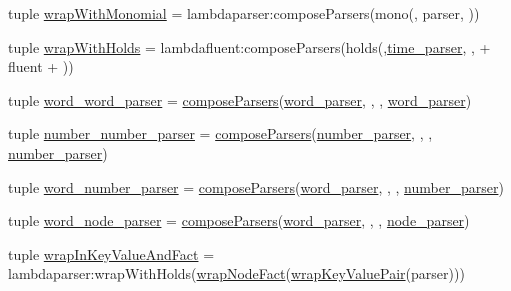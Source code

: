 \begin{DoxyCompactItemize}
\item 
tuple \hyperlink{namespaceeqn__viz_afead5f7b23dd83ce8d2c7092b9887606}{wrap\+With\+Monomial} = lambdaparser\+:compose\+Parsers(\textquotesingle{}mono(\textquotesingle{}, parser, \textquotesingle{})\textquotesingle{})
\item 
tuple \hyperlink{namespaceeqn__viz_a66245c2eeb429b7809bc02fc6852d0ec}{wrap\+With\+Holds} = lambdafluent\+:compose\+Parsers(\textquotesingle{}holds(\textquotesingle{},\hyperlink{namespaceeqn__viz_a7bf2f0fb75b2d7a493e3ebf9cf2f580e}{time\+\_\+parser}, \textquotesingle{},\textquotesingle{} + fluent + \textquotesingle{})\textquotesingle{})
\item 
tuple \hyperlink{namespaceeqn__viz_aaabd8c0ea3860c55e9022abed90dab61}{word\+\_\+word\+\_\+parser} = \hyperlink{namespaceeqn__viz_a77840944e82440038b71417a8d7204b1}{compose\+Parsers}(\hyperlink{namespaceeqn__viz_ad9dc00d4b3c0b288d0f204937297b179}{word\+\_\+parser}, \textquotesingle{},\textquotesingle{} , \hyperlink{namespaceeqn__viz_ad9dc00d4b3c0b288d0f204937297b179}{word\+\_\+parser})
\item 
tuple \hyperlink{namespaceeqn__viz_ae9d46b4030dff778fd4a908af15b1461}{number\+\_\+number\+\_\+parser} = \hyperlink{namespaceeqn__viz_a77840944e82440038b71417a8d7204b1}{compose\+Parsers}(\hyperlink{namespaceeqn__viz_a5e65c3435a54324008033d990d858e72}{number\+\_\+parser}, \textquotesingle{},\textquotesingle{} , \hyperlink{namespaceeqn__viz_a5e65c3435a54324008033d990d858e72}{number\+\_\+parser})
\item 
tuple \hyperlink{namespaceeqn__viz_a125896c7d7db5d4f150b2b6699176c2a}{word\+\_\+number\+\_\+parser} = \hyperlink{namespaceeqn__viz_a77840944e82440038b71417a8d7204b1}{compose\+Parsers}(\hyperlink{namespaceeqn__viz_ad9dc00d4b3c0b288d0f204937297b179}{word\+\_\+parser}, \textquotesingle{},\textquotesingle{} , \hyperlink{namespaceeqn__viz_a5e65c3435a54324008033d990d858e72}{number\+\_\+parser})
\item 
tuple \hyperlink{namespaceeqn__viz_ade698a80074d34a48d27d50b0b6faafc}{word\+\_\+node\+\_\+parser} = \hyperlink{namespaceeqn__viz_a77840944e82440038b71417a8d7204b1}{compose\+Parsers}(\hyperlink{namespaceeqn__viz_ad9dc00d4b3c0b288d0f204937297b179}{word\+\_\+parser}, \textquotesingle{},\textquotesingle{} , \hyperlink{namespaceeqn__viz_aa3f9b7373809e0e391e1383fd878b616}{node\+\_\+parser})
\item 
tuple \hyperlink{namespaceeqn__viz_aff7c3fc95453270d356d2c9fef5be210}{wrap\+In\+Key\+Value\+And\+Fact} = lambdaparser\+:wrap\+With\+Holds(\hyperlink{namespaceeqn__viz_a716255e5870a531e1bfc6d184278bc8d}{wrap\+Node\+Fact}(\hyperlink{namespaceeqn__viz_adf51f57cbfcd953ec98550b85dcc3d0c}{wrap\+Key\+Value\+Pair}(parser)))

\end{DoxyCompactItemize}

